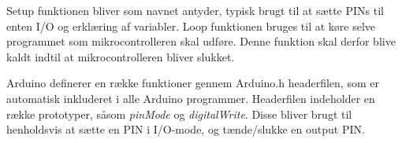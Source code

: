 
\noindent Setup funktionen bliver som navnet antyder, typisk brugt til at sætte PINs til enten I/O og erklæring af variabler. Loop funktionen bruges til at køre selve programmet som mikrocontrolleren skal udføre. Denne funktion skal derfor blive kaldt indtil at mikrocontrolleren bliver slukket.

Arduino definerer en række funktioner gennem Arduino.h headerfilen, som er automatisk inkluderet i alle Arduino programmer. Headerfilen indeholder en række prototyper, såsom \textit{pinMode} og \textit{digitalWrite}. Disse bliver brugt til henholdsvis at sætte en PIN i I/O-mode, og tænde/slukke en output PIN.












